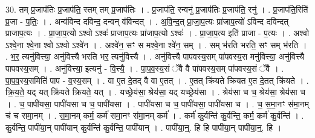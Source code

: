 \documentclass[17pt]{extarticle}
\begin{document}
30. तम् प्र॒जाप॑तिः प्र॒जाप॑ति॒ स्तम् तम् प्र॒जाप॑तिः । . प्र॒जाप॑ति॒ रन्वनु॑ प्र॒जाप॑तिः प्र॒जाप॑ति॒ रनु॑ । . प्र॒जाप॑ति॒रिति॑ प्र॒जा - प॒तिः॒ । . अन्व॑विन्द दविन्द॒ दन्वन् व॑विन्दत् । . अ॒वि॒न्द॒त् प्रा॒जा॒प॒त्यः प्रा॑जाप॒त्यो॑ ऽविन्द दविन्दत् प्राजाप॒त्यः । . प्रा॒जा॒प॒त्यो ऽश्वो ऽश्वः॑ प्राजाप॒त्यः प्रा॑जाप॒त्यो ऽश्वः॑ । . प्रा॒जा॒प॒त्य इति॑ प्राजा - प॒त्यः । . अश्वो ऽश्वे॒ना श्वे॒ना श्वो ऽश्वो ऽश्वे॑न । . अश्वे॑न॒ सꣳ स मश्वे॒ना श्वे॑न॒ सम् । . सम् भ॑रति भरति॒ सꣳ सम् भ॑रति । . भ॒र॒ त्यनु॑वित्त्या॒ अनु॑वित्त्यै भरति भर॒ त्यनु॑वित्त्यै । . अनु॑वित्त्यै पापवस्य॒सम् पा॑पवस्य॒स मनु॑वित्त्या॒ अनु॑वित्त्यै पापवस्य॒सम् । . अनु॑वित्त्या॒ इत्यनु॑ - वि॒त्त्यै॒ । . पा॒प॒व॒स्य॒सं ॅवै वै पा॑पवस्य॒सम् पा॑पवस्य॒सं ॅवै । . पा॒प॒व॒स्य॒समिति॑ पाप - व॒स्य॒सम् । . वा ए॒त दे॒तद् वै वा ए॒तत् । . ए॒तत् क्रि॑यते क्रियत ए॒त दे॒तत् क्रि॑यते । . क्रि॒य॒ते॒ यद् यत् क्रि॑यते क्रियते॒ यत् । . यच्छ्रेय॑सा॒ श्रेय॑सा॒ यद् यच्छ्रेय॑सा । . श्रेय॑सा च च॒ श्रेय॑सा॒ श्रेय॑सा च । . च॒ पापी॑यसा॒ पापी॑यसा च च॒ पापी॑यसा । . पापी॑यसा च च॒ पापी॑यसा॒ पापी॑यसा च । . च॒ स॒मा॒नꣳ स॑मा॒नम् च॑ च समा॒नम् । . स॒मा॒नम् कर्म॒ कर्म॑ समा॒नꣳ स॑मा॒नम् कर्म॑ । . कर्म॑ कु॒र्वन्ति॑ कु॒र्वन्ति॒ कर्म॒ कर्म॑ कु॒र्वन्ति॑ । . कु॒र्वन्ति॒ पापी॑या॒न् पापी॑यान् कु॒र्वन्ति॑ कु॒र्वन्ति॒ पापी॑यान् । . पापी॑या॒न्॒. हि हि पापी॑या॒न् पापी॑या॒न्॒. हि । \newline
\end{document}
